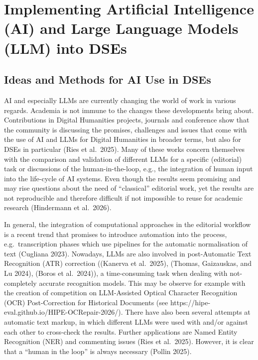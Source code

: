 \documentclass[
  letterpaper,
  DIV=11,
  numbers=noendperiod]{scrreprt}
\begin{document}
\section{Implementing Artificial Intelligence (AI) and Large Language
Models (LLM) into
DSEs}\label{implementing-artificial-intelligence-ai-and-large-language-models-llm-into-dses}

\subsection{Ideas and Methods for AI Use in
DSEs}\label{ideas-and-methods-for-ai-use-in-dses}

AI and especially LLMs are currently changing the world of work in
various regards. Academia is not immune to the changes these
developments bring about. Contributions in Digital Humanities projects,
journals and conference show that the community is discussing the
promises, challenges and issues that come with the use of AI and LLMs
for Digital Humanities in broader terms, but also for DSEs in particular
(Ries et al.~2025). Many of these works concern themselves with the
comparison and validation of different LLMs for a specific (editorial)
task or discussions of the human-in-the-loop, e.g., the integration of
human input into the life-cycle of AI systems. Even though the results
seem promising and may rise questions about the need of ``classical''
editorial work, yet the results are not reproducible and therefore
difficult if not impossible to reuse for academic research (Hindermann
et al.~2026).

In general, the integration of computational approaches in the editorial
workflow is a recent trend that promises to introduce automation into
the process, e.g.~transcription phases which use pipelines for the
automatic normalisation of text (Cugliana 2023). Nowadays, LLMs are also
involved in post-Automatic Text Recognition (ATR) correction ((Kanerva
et al.~2025), (Thomas, Gaizauskas, and Lu 2024), (Boros et al.~2024)), a
time-consuming task when dealing with not-completely accurate
recognition models. This may be observe for example with the creation of
competition on LLM-Assisted Optical Character Recognition (OCR)
Post-Correction for Historical Documents (see
https://hipe-eval.github.io/HIPE-OCRepair-2026/). There have also been
several attempts at automatic text markup, in which different LLMs were
used with and/or against each other to cross-check the results. Further
applications are Named Entity Recognition (NER) and commenting issues
(Ries et al.~2025). However, it is clear that a ``human in the loop'' is
always necessary (Pollin 2025).
\end{document}
